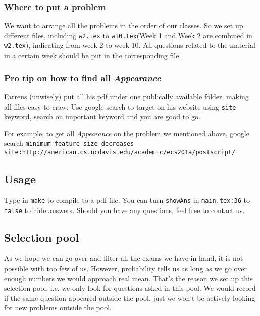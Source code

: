 
\subsubsection*{Where to put a problem}

We want to arrange all the problems in the order of our classes.
So we set up different files, including \texttt{w2.tex} to \texttt{w10.tex}(Week 1 and Week 2 are combined in \texttt{w2.tex}), indicating from week 2 to week 10.
All questions related to the material in a certain week should be put in the corresponding file.

\subsubsection*{Pro tip on how to find all \textit{Appearance}}

Farrens (unwisely) put all his pdf under one publically available folder, making all files easy to craw.
Use google search to target on his website using \texttt{site} keyword, search on important keyword and you are good to go.

For example, to get all \textit{Appearance} on the problem we mentioned above, google search \texttt{minimum feature size decreases site:http://american.cs.ucdavis.edu/academic/ecs201a/postscript/}

\subsection*{Usage}

Type in \lstinline{make} to compile to a pdf file. 
You can turn \texttt{showAns} in \texttt{main.tex:36} to \texttt{false} to hide answers.
Should you have any questions, feel free to contact us.

\subsection*{Selection pool}

As we hope we can go over and filter all the exams we have in hand, it is not possible with too few of us.
However, probability tells us as long as we go over enough numbers we would approach real mean.
That's the reason we set up this selection pool, i.e. we only look for questions asked in this pool. 
We would record if the same question appeared outside the pool, just we won't be actively looking for new problems outside the pool.

